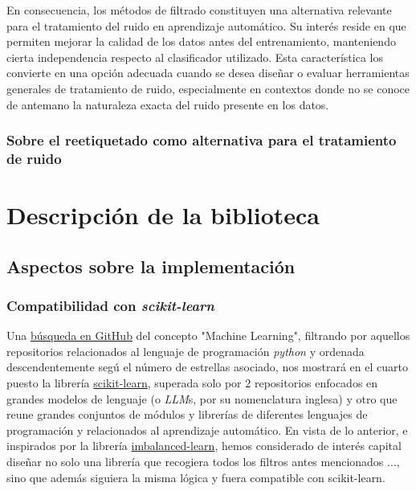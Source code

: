 \documentclass[print, color]{ugrTFG}
\begin{document}
 En consecuencia, los métodos de filtrado constituyen una alternativa relevante para el tratamiento del ruido en aprendizaje automático. Su interés reside en que permiten mejorar la calidad de los datos antes del entrenamiento, manteniendo cierta independencia respecto al clasificador utilizado. Esta característica los convierte en una opción adecuada cuando se desea diseñar o evaluar herramientas generales de tratamiento de ruido, especialmente en contextos donde no se conoce de antemano la naturaleza exacta del ruido presente en los datos.

 \subsection{Sobre el reetiquetado como alternativa para el tratamiento de ruido}


\chapter{Descripción de la biblioteca}\label{sect:descBiblio}

\section{Aspectos sobre la implementación}

 \subsection{Compatibilidad con \textit{scikit-learn}}
 Una \href{https://github.com/search?q=machine+learning+language%3APython&type=repositories&l=Python&s=stars&o=desc}{búsqueda en GitHub} del concepto "Machine Learning", filtrando por aquellos repositorios relacionados al lenguaje de programación \textit{python} y ordenada descendentemente segú el número de estrellas asociado, nos mostrará en el cuarto puesto la librería \href{https://github.com/scikit-learn/scikit-learn}{scikit-learn}, superada solo por 2 repositorios enfocados en grandes modelos de lenguaje (o \textit{LLM}s, por su nomenclatura inglesa) y otro que reune grandes conjuntos de módulos y librerías de diferentes lenguajes de programación y relacionados al aprendizaje automático. En vista de lo anterior, e inspirados por la librería \href{https://github.com/scikit-learn-contrib/imbalanced-learn}{imbalanced-learn}, hemos considerado de interés capital diseñar no solo una librería que recogiera todos los filtros antes mencionados ..., sino que además siguiera la misma lógica y fuera compatible con scikit-learn.
\end{document}

